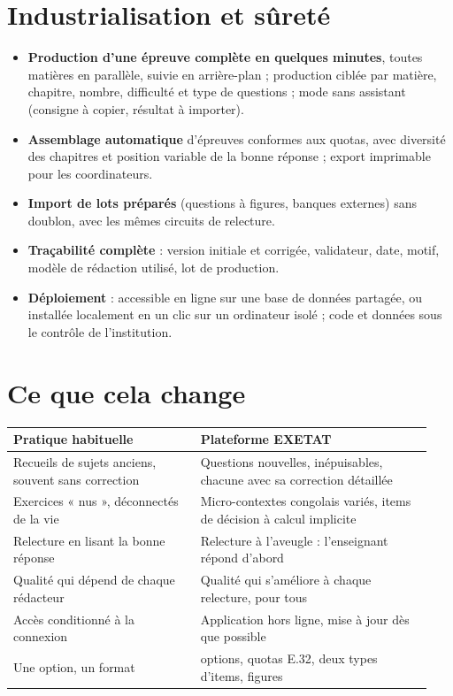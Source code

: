 \documentclass[11pt,a4paper]{article}
\begin{document}
\section{Industrialisation et sûreté}

\begin{itemize}
  \item \textbf{Production d'une épreuve complète en quelques minutes}, toutes matières en parallèle, suivie en arrière-plan ; production ciblée par matière, chapitre, nombre, difficulté et type de questions ; mode sans assistant (consigne à copier, résultat à importer).
  \item \textbf{Assemblage automatique} d'épreuves conformes aux quotas, avec diversité des chapitres et position variable de la bonne réponse ; export imprimable pour les coordinateurs.
  \item \textbf{Import de lots préparés} (questions à figures, banques externes) sans doublon, avec les mêmes circuits de relecture.
  \item \textbf{Traçabilité complète} : version initiale et corrigée, validateur, date, motif, modèle de rédaction utilisé, lot de production.
  \item \textbf{Déploiement} : accessible en ligne sur une base de données partagée, ou installée localement en un clic sur un ordinateur isolé ; code et données sous le contrôle de l'institution.
\end{itemize}

\section{Ce que cela change}

\begin{center}
\renewcommand{\arraystretch}{1.25}
\begin{tabular}{>{\raggedright\arraybackslash}p{0.42\linewidth}>{\raggedright\arraybackslash}p{0.52\linewidth}}
\toprule
\textbf{Pratique habituelle} & \textbf{Plateforme EXETAT} \\
\midrule
Recueils de sujets anciens, souvent sans correction & Questions nouvelles, inépuisables, chacune avec sa correction détaillée \\
Exercices « nus », déconnectés de la vie & Micro-contextes congolais variés, items de décision à calcul implicite \\
Relecture en lisant la bonne réponse & Relecture à l'aveugle : l'enseignant répond d'abord \\
Qualité qui dépend de chaque rédacteur & Qualité qui s'améliore à chaque relecture, pour tous \\
Accès conditionné à la connexion & Application hors ligne, mise à jour dès que possible \\
Une option, un format & 48 options, quotas E.32, deux types d'items, figures \\
\bottomrule
\end{tabular}
\end{center}
\end{document}

